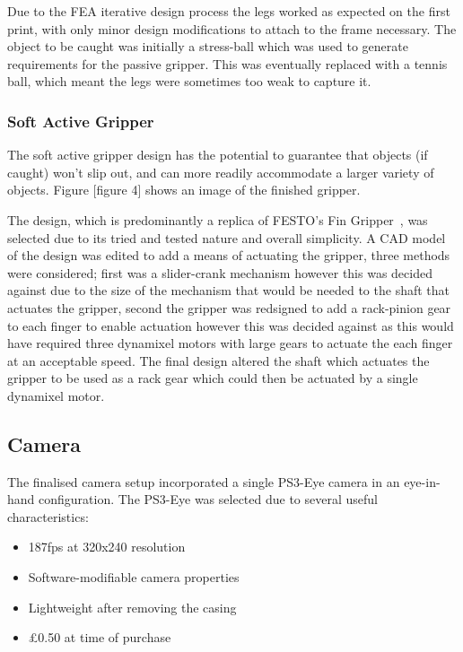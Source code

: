 \documentclass[conference]{IEEEtran}
\begin{document}
	Due to the FEA iterative design process the legs worked as expected on the first print, with only minor design modifications to attach to the frame necessary. The object to be caught was initially a stress-ball which was used to generate requirements for the passive gripper. This was eventually replaced with a tennis ball, which meant the legs were sometimes too weak to capture it. 
	\subsubsection{Soft Active Gripper}
	The soft active gripper design has the potential to guarantee that objects (if caught) won’t slip out, and can more readily accommodate a larger variety of objects. Figure [figure 4] shows an image of the finished gripper.
	
	The design, which is predominantly a replica of FESTO’s Fin Gripper~\cite{festofin}, was selected due to its tried and tested nature and overall simplicity. A CAD model of the design was edited to add a means of actuating the gripper, three methods were considered; first was a slider-crank mechanism however this was decided against due to the size of the mechanism that would be needed to the shaft that actuates the gripper, second the gripper was redsigned to add a rack-pinion gear to each finger to enable actuation however this was decided against as this would have required three dynamixel motors with large gears to actuate the each finger at an acceptable speed. The final design altered the shaft which actuates the gripper to be used as a rack gear which could then be actuated by a single dynamixel motor.
	
	

	
	\subsection{Camera}\label{camera}
	The finalised camera setup incorporated a single PS3-Eye camera in an eye-in-hand configuration. The PS3-Eye was selected due to several useful characteristics:
	\begin{itemize}
		\item 187fps at 320x240 resolution
		
		\item Software-modifiable camera properties
		
		\item Lightweight after removing the casing
		
		\item \pounds0.50 at time of purchase
	\end{itemize}
	
\end{document}
